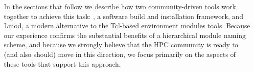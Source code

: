 In the sections that follow we describe how two community-driven tools work
together to achieve this task: \easybuild{}, a software build and installation
framework, and Lmod, a modern alternative to the Tcl-based environment modules
tools. Because our experience confirms the substantial benefits of a hierarchical
module naming scheme, and because we strongly believe that the HPC community is
ready to (and also should) move in this direction, we focus primarily on the aspects
of these tools that support this approach.
